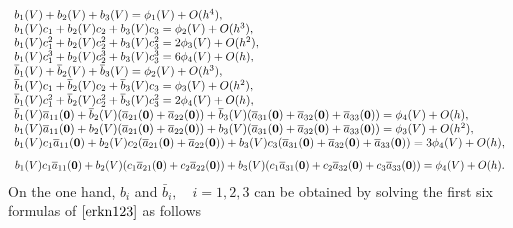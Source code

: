\documentclass{article}
\begin{document}
\begin{equation}
\begin{array}
[c]{ll}b_{1}(V)+b_{2}(V)+b_{3}(V)=\phi_{1}(V)+O(h^{4}),
\\b_{1}(V)c_{1}+b_{2}(V)c_{2}+b_{3}(V)c_{3}=\phi_{2}(V)+O(h^{3}),
\\b_{1}(V)c_{1}^{2}+b_{2}(V)c_{2}^{2}+b_{3}(V)c_{3}^{2}=2\phi_{3}(V)+O(h^{2}),
\\b_{1}(V)c_{1}^{3}+b_{2}(V)c_{2}^{3}+b_{3}(V)c_{3}^{3}=6\phi_{4}(V)+O(h),
\\\overline{b}_{1}(V)+\overline{b}_{2}(V)+\overline{b}_{3}(V)=\phi_{2}(V)+O(h^{3}),
\\\overline{b}_{1}(V)c_{1}+\overline{b}_{2}(V)c_{2}+\overline{b}_{3}(V)c_{3}=\phi_{3}(V)+O(h^{2}),
\\\overline{b}_{1}(V)c_{1}^{2}+\overline{b}_{2}(V)c_{2}^{2}+\overline{b}_{3}(V)c_{3}^{2}=2\phi_{4}(V)+O(h),\\
\overline{b}_{1}(V)\overline{a}_{11}(\textbf{0})+\overline{b}_{2}(V)(\overline{a}_{21}(\textbf{0})+\overline{a}_{22}(\textbf{0}))+\overline{b}_{3}(V)(\overline{a}_{31}(\textbf{0})+\overline{a}_{32}(\textbf{0})+\overline{a}_{33}(\textbf{0}))=\phi_{4}(V)+O(h),
\\b_{1}(V)\overline{a}_{11}(\textbf{0})+b_{2}(V)(\overline{a}_{21}(\textbf{0})+\overline{a}_{22}(\textbf{0}))+b_{3}(V)(\overline{a}_{31}(\textbf{0})+\overline{a}_{32}(\textbf{0})+\overline{a}_{33}(\textbf{0}))=\phi_{3}(V)+O(h^{2}),\\
b_{1}(V)c_{1}\overline{a}_{11}(\textbf{0})+b_{2}(V)c_{2}(\overline{a}_{21}(\textbf{0})+\overline{a}_{22}(\textbf{0}))+b_{3}(V)c_{3}(\overline{a}_{31}(\textbf{0})+\overline{a}_{32}(\textbf{0})+\overline{a}_{33}(\textbf{0}))=3\phi_{4}(V)+O(h),
\\
\end{array}
 \label{Schems100}%
\end{equation}
\begin{equation*}
\begin{array}
[c]{ll}
b_{1}(V)c_{1}\overline{a}_{11}(\textbf{0})+b_{2}(V)(c_{1}\overline{a}_{21}(\textbf{0})+c_{2}\overline{a}_{22}(\textbf{0}))+b_{3}(V)(c_{1}\overline{a}_{31}(\textbf{0})+c_{2}\overline{a}_{32}(\textbf{0})+c_{3}\overline{a}_{33}(\textbf{0}))=\phi_{4}(V)
+O(h).
\end{array}
\end{equation*}
On the one hand, $b_{i}$ and $\bar{b}_{i},$\ \ $i=1,2,3$ can be
obtained  by solving the first six formulas of $\eqref{erkn123}$ as
follows
\end{document}
